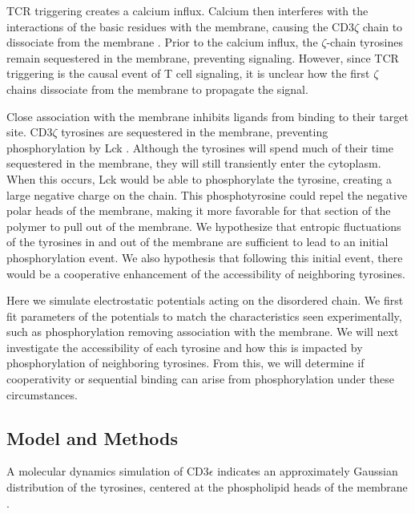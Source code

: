 \documentclass[../../AdvancementSummary.tex]{subfiles}
\begin{document}
TCR triggering creates a calcium influx. Calcium then interferes with the interactions of the basic residues with the membrane, causing the CD3$\zeta$ chain to dissociate from the membrane \cite{Shi2013}. Prior to the calcium influx, the $\zeta$-chain tyrosines remain sequestered in the membrane, preventing signaling. However, since TCR triggering is the causal event of T cell signaling, it is unclear how the first $\zeta$ chains dissociate from the membrane to propagate the signal. 

Close association with the membrane inhibits ligands from binding to their target site. CD3$\zeta$ tyrosines are sequestered in the membrane, preventing phosphorylation by Lck \cite{Aivazian2000, Shi2013}. Although the tyrosines will spend much of their time sequestered in the membrane, they will still transiently enter the cytoplasm. When this occurs, Lck would be able to phosphorylate the tyrosine, creating a large negative charge on the chain. This phosphotyrosine could repel the negative polar heads of the membrane, making it more favorable for that section of the polymer to pull out of the membrane. We hypothesize that entropic fluctuations of the tyrosines in and out of the membrane are sufficient to lead to an initial phosphorylation event. We also hypothesis that following this initial event, there would be a cooperative enhancement of the accessibility of neighboring tyrosines.

Here we simulate electrostatic potentials acting on the disordered chain. We first fit parameters of the potentials to match the characteristics seen experimentally, such as phosphorylation removing association with the membrane. We will next investigate the accessibility of each tyrosine and how this is impacted by phosphorylation of neighboring tyrosines. From this, we will determine if cooperativity or sequential binding can arise from phosphorylation under these circumstances.


\subsection{Model and Methods}


A molecular dynamics simulation of CD3$\epsilon$ indicates an approximately Gaussian distribution of the tyrosines, centered at the phospholipid heads of the membrane \cite{Lopez2015}.
\end{document}
